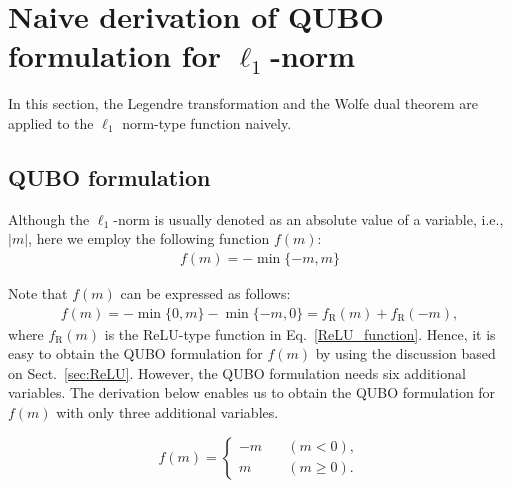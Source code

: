 \documentclass[fp,twocolumn]{jpsj3}
\begin{document}
\section{Naive derivation of QUBO formulation for $\ell_{1}$-norm} \label{Native_derivation}


In this section, the Legendre transformation and the Wolfe dual theorem are applied to the $\ell_{1}$ norm-type function naively. 


\subsection{QUBO formulation}

Although the $\ell_{1}$-norm is usually denoted as an absolute value of a variable, i.e., $\lvert m \rvert$, here we employ the following function $f(m)$:\\
\begin{eqnarray}
  f(m)=-\min{\{-m,m\}} \label{l1-norm}
\end{eqnarray}



Note that $f(m)$ can be expressed as follows:
\begin{eqnarray}
f(m)=-\min{\{0,m\}} - \min\{-m,0 \} = f_{\mathrm{R}}(m) + f_{\mathrm{R}}(-m),
\end{eqnarray}
where $f_{\mathrm{R}}(m)$ is the ReLU-type function in Eq.~\eqref{ReLU_function}.
Hence, it is easy to obtain the QUBO formulation for $f(m)$ by using the discussion based on Sect.~\ref{sec:ReLU}.
However, the QUBO formulation needs six additional variables.
The derivation below enables us to obtain the QUBO formulation for $f(m)$ with only three additional variables.

\begin{equation}
  f(m)= \left\{
  \begin{aligned}
    -m\quad & (m <0), \nonumber \\
     m\quad & (m\geq 0). 
  \end{aligned}
  \right.
\end{equation}
\end{document}
